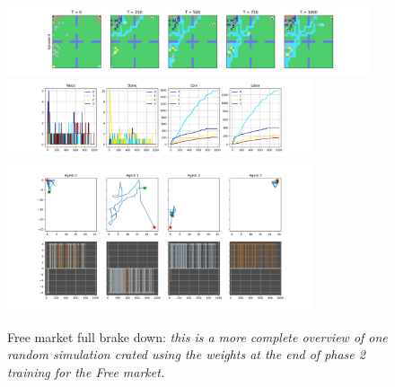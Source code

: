 \begin{figure}[h!]
    \centering
    \linespread{.9}
    \includegraphics[width=0.95\textwidth]{Resources/imgs/Figure_1_Free.png}
    \includegraphics[width=0.80\textwidth]{Resources/imgs/Figure_2_Free.png}
    \includegraphics[width=0.80\textwidth]{Resources/imgs/Figure_3_Free.png}
    \caption[Free market full brake down: ]%
    {\label{img:Free_brakedown}Free market full brake down: \small \textit{this is a more complete overview of one random simulation crated using the weights at the end of phase 2 training for the Free market.}}
\end{figure}

